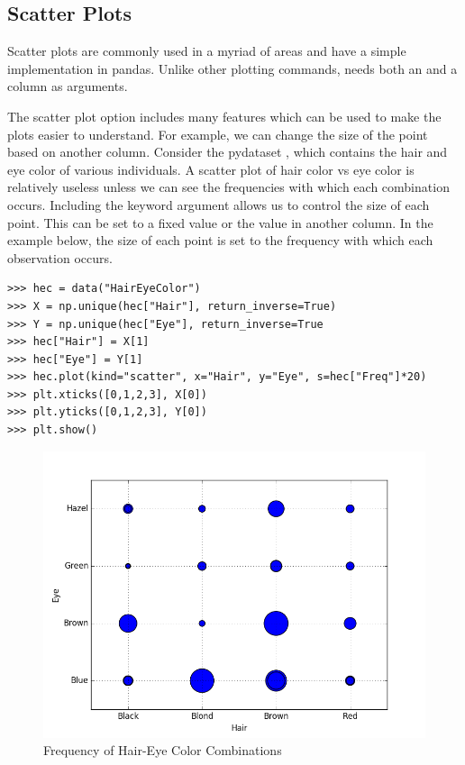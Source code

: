 \subsection*{Scatter Plots}

Scatter plots are commonly used in a myriad of areas and have a simple implementation in pandas. Unlike other plotting commands,  needs both an  and a  column as arguments.

The scatter plot option includes many features which can be used to make the plots easier to understand.  For example, we can change the size of the point based on another column.  Consider the pydataset , which contains the hair and eye color of various individuals. A scatter plot of hair color vs eye color is relatively useless unless we can see the frequencies with which each combination occurs.  Including the keyword argument  allows us to control the size of each point.  This can be set to a fixed value or the value in another column.  In the example below, the size of each point is set to the frequency with which each observation occurs.  

\begin{lstlisting}
>>> hec = data("HairEyeColor")
>>> X = np.unique(hec["Hair"], return_inverse=True)
>>> Y = np.unique(hec["Eye"], return_inverse=True
>>> hec["Hair"] = X[1]
>>> hec["Eye"] = Y[1]
>>> hec.plot(kind="scatter", x="Hair", y="Eye", s=hec["Freq"]*20)
>>> plt.xticks([0,1,2,3], X[0])
>>> plt.yticks([0,1,2,3], Y[0])
>>> plt.show()
\end{lstlisting}

\begin{figure}[H] 
    \centering
    \includegraphics[width=.75\textwidth]{HairEyeColorscatter.png}
    \caption{Frequency of Hair-Eye Color Combinations}
\end{figure}


